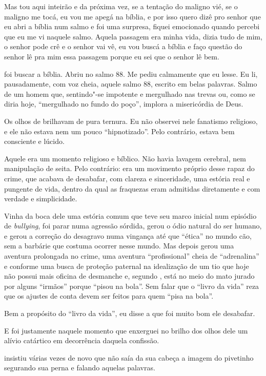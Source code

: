 Mas tou aqui inteirão e da próxima vez, se a tentação do maligno vié, se
o maligno me tocá, eu vou me apegá na bíblia, e por isso quero dizê pro
senhor que eu abri a bíblia num salmo e foi uma surpresa, fiquei
emocionado quando percebi que eu me vi naquele salmo. Aquela passagem
era minha vida, dizia tudo de mim, o senhor pode crê e o senhor vai vê,
eu vou buscá a bíblia e faço questão do senhor lê pra mim essa passagem
porque eu sei que o senhor lê bem.

\asterisc{}

 foi buscar a bíblia. Abriu no salmo 88. Me pediu calmamente que eu
lesse. Eu li, pausadamente, com voz cheia, aquele salmo 88, escrito em
belas palavras. Salmo de um homem que, sentindo"-se impotente e
mergulhado nas trevas ou, como se diria hoje, ``mergulhado no fundo do
poço'', implora a misericórdia de Deus.

Os olhos de  brilhavam de pura ternura. Eu não observei nele fanatismo
religioso, e ele não estava nem um pouco ``hipnotizado''. Pelo
contrário, estava bem consciente e lúcido.

Aquele era um momento religioso e bíblico. Não havia lavagem cerebral,
nem manipulação de seita. Pelo contrário: era um movimento próprio desse
rapaz do crime, que acabava de desabafar, com clareza e sinceridade, uma
estória real e pungente de vida, dentro da qual as fraquezas eram
admitidas diretamente e com verdade e simplicidade.

Vinha da boca dele uma estória comum que teve seu marco inicial num
episódio de \emph{bullying}, foi parar numa agressão sórdida, gerou o
ódio natural do ser humano, e gerou a correção do desagravo numa
vingança até que ``ética'' no mundo cão, sem a barbárie que costuma
ocorrer nesse mundo. Mas depois gerou uma aventura prolongada no crime,
uma aventura ``profissional'' cheia de ``adrenalina'' e conforme uma
busca de proteção paternal na idealização de um tio que hoje não possui
mais oficina de desmanche e, segundo , está no meio do mato jurado por
alguns ``irmãos'' porque ``pisou na bola''. Sem falar que o ``livro da
vida'' reza que os ajustes de conta devem ser feitos para quem ``pisa na
bola''.

Bem a propósito do ``livro da vida'', eu disse a  que foi muito bom
ele desabafar.

E foi justamente naquele momento que enxerguei no brilho dos olhos dele
um alívio catártico em decorrência daquela confissão.

 insistiu várias vezes de novo que não saía da sua cabeça a imagem do
pivetinho segurando sua perna e falando aquelas palavras.

